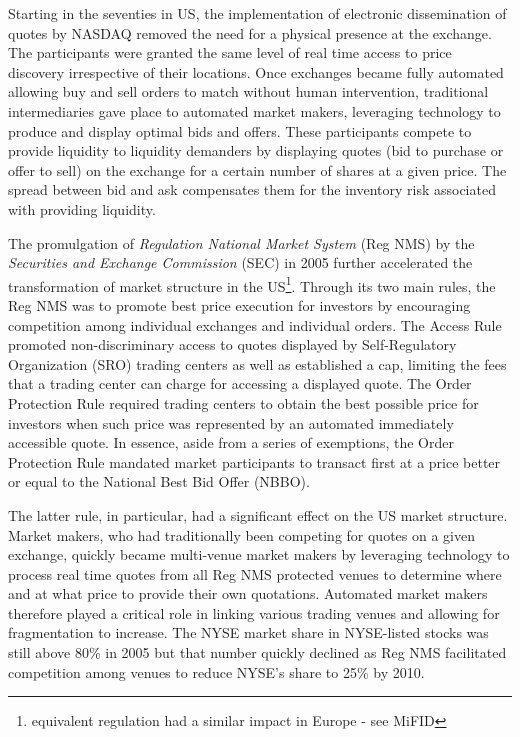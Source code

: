 Starting in the seventies in US, the implementation of electronic dissemination of quotes by NASDAQ removed the need for a physical presence at the exchange. The participants were granted the same level of real time access to price discovery irrespective of their locations. Once exchanges became fully automated allowing buy and sell orders to match without human intervention, traditional intermediaries gave place to automated market makers, leveraging technology to produce and display optimal bids and offers. These participants compete to provide liquidity to liquidity demanders by displaying quotes (bid to purchase or offer to sell) on the exchange for a certain number of shares at a given price. The spread between bid and ask compensates them for the inventory risk associated with providing liquidity. 


The promulgation of \textit{Regulation National Market System} (Reg NMS) by the  \textit{Securities and Exchange Commission} (SEC) in 2005 further accelerated the transformation of market structure in the US\footnote{equivalent regulation had a similar impact in Europe - see MiFID}. Through its two main rules, the Reg NMS was to promote best price execution for investors by encouraging competition among individual exchanges and individual orders. The Access Rule promoted non-discriminary access to quotes displayed by Self-Regulatory Organization (SRO) trading centers as well as established a cap, limiting the fees that a trading center can charge for accessing a displayed quote. The Order Protection Rule required trading centers to obtain the best possible price for investors when such price was represented by an automated immediately accessible quote. In essence, aside from a series of exemptions, the Order Protection Rule mandated market participants to transact first at a price better or equal to the National Best Bid Offer (NBBO). 


The latter rule, in particular, had a significant effect on the US market structure. Market makers, who had traditionally been competing for quotes on a given exchange, quickly became multi-venue market makers by leveraging technology to process real time  quotes from all Reg NMS protected venues to determine where and at what price to provide their own quotations. Automated market makers therefore played a critical role in linking various trading venues and allowing for fragmentation to increase. The NYSE market share in NYSE-listed stocks was still above 80\% in 2005 but that number quickly declined as Reg NMS facilitated competition among venues to reduce NYSE's share to 25\% by 2010. 


